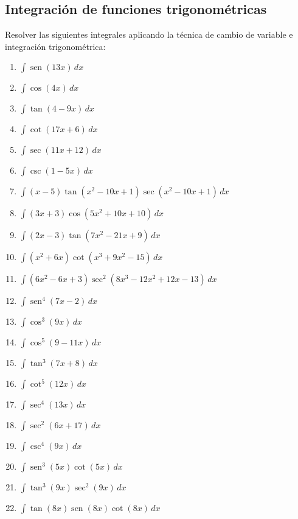 \documentclass{article}
\begin{document}
\begin{multicols}{2}
\section*{Integración de funciones trigonométricas}
Resolver las siguientes integrales aplicando la técnica de cambio de variable e integración trigonométrica:

\begin{enumerate}
    \item $\displaystyle \int \operatorname{sen}( 13x) \, dx$
    \item $\displaystyle \int \cos (4x) \, dx$
    \item $\displaystyle \int \tan (4 - 9x) \, dx$
    \item $\displaystyle \int \cot (17x + 6) \, dx$
    \item $\displaystyle \int \sec (11x + 12) \, dx$
    \item $\displaystyle \int \csc (1 - 5x) \, dx$
    \item $\displaystyle \int (x - 5) \tan (x^2 - 10x + 1) \sec (x^2 - 10x + 1) \, dx$
    \item $\displaystyle \int (3x + 3) \cos (5x^2 + 10x + 10) \, dx$
    \item $\displaystyle \int (2x - 3) \tan (7x^2 - 21x + 9) \, dx$
    \item $\displaystyle \int (x^2 + 6x) \cot (x^3 + 9x^2 - 15) \, dx$
    \item $\displaystyle \int (6x^2 - 6x + 3) \sec^2 (8x^3 - 12x^2 + 12x - 13) \, dx$
    \item $\displaystyle \int \operatorname{sen}^4 (7x - 2) \, dx$
    \item $\displaystyle \int \cos^3 (9x) \, dx$
    \item $\displaystyle \int \cos^5 (9 - 11x) \, dx$
    \item $\displaystyle \int \tan^3 (7x + 8) \, dx$
    \item $\displaystyle \int \cot^5 (12x) \, dx$
    \item $\displaystyle \int \sec^4 (13x) \, dx$
    \item $\displaystyle \int \sec^2 (6x + 17) \, dx$
    \item $\displaystyle \int \csc^4 (9x) \, dx$
    \item $\displaystyle \int \operatorname{sen}^3 (5x) \cot (5x) \, dx$
    \item $\displaystyle \int \tan^3 (9x) \sec^2 (9x) \, dx$
    \item $\displaystyle \int \tan (8x) \operatorname{sen} (8x) \cot (8x) \, dx$

\end{enumerate}
\end{multicols}
\end{document}
